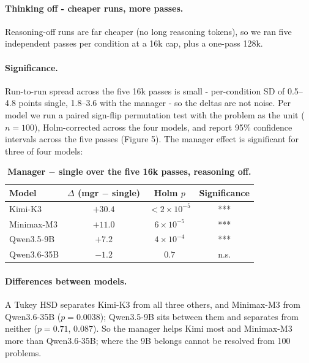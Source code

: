 \documentclass[11pt]{article}
\begin{document}
\FloatBarrier

\paragraph{Thinking off - cheaper runs, more passes.}
Reasoning-off runs are far cheaper (no long reasoning tokens), so we ran
five independent passes per condition at a 16k cap, plus a one-pass 128k.

\paragraph{Significance.}
Run-to-run spread across the five 16k passes is small - per-condition SD of 0.5--4.8 points
single, 1.8--3.6 with the manager - so the deltas are not noise. Per model we run a
paired sign-flip permutation test with the problem as the unit ($n = 100$),
Holm-corrected across the four models, and report 95\% confidence intervals across the five
passes (Figure 5). The manager effect is significant for three of four models:

\begin{table}[htbp]
\centering
\caption{\textbf{Manager $-$ single over the five 16k passes, reasoning off.}}
\small
\begin{tabular}{@{}lccc@{}}
\toprule
\textbf{Model} & \textbf{$\Delta$ (mgr $-$ single)} & \textbf{Holm $p$} & \textbf{Significance} \\
\midrule
Kimi-K3     & $+30.4$ & $< 2\times10^{-5}$ & *** \\
Minimax-M3  & $+11.0$ & $6\times10^{-5}$   & *** \\
Qwen3.5-9B  & $+7.2$  & $4\times10^{-4}$   & *** \\
Qwen3.6-35B & $-1.2$  & $0.7$              & n.s. \\
\bottomrule
\end{tabular}
\end{table}

\paragraph{Differences between models.}
A Tukey HSD separates Kimi-K3 from all three others, and Minimax-M3 from Qwen3.6-35B
($p = 0.0038$); Qwen3.5-9B sits between them and separates from neither ($p = 0.71$,
$0.087$). So the manager helps Kimi most and Minimax-M3 more than Qwen3.6-35B; where the
9B belongs cannot be resolved from 100 problems.
\end{document}
